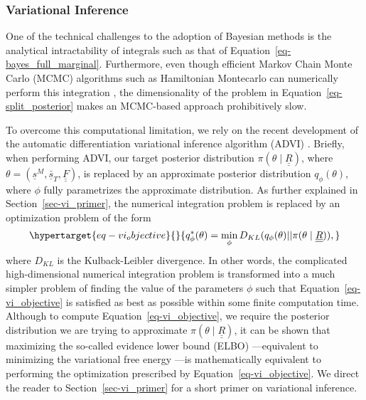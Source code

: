 \documentclass[
  letterpaper,
  DIV=11,
  numbers=noendperiod]{scrartcl}
\begin{document}
\begin{refsegment}
{\subsubsection{Variational Inference}\label{variational-inference}}

One of the technical challenges to the adoption of Bayesian methods is
the analytical intractability of integrals such as that of
Equation~\ref{eq-bayes_full_marginal}. Furthermore, even though
efficient Markov Chain Monte Carlo (MCMC) algorithms such as Hamiltonian
Montecarlo can numerically perform this integration
\autocite{betancourt2017}, the dimensionality of the problem in
Equation~\ref{eq-split_posterior} makes an MCMC-based approach
prohibitively slow.

To overcome this computational limitation, we rely on the recent
development of the automatic differentiation variational inference
algorithm (ADVI) \autocite{kucukelbir2016}. Briefly, when performing
ADVI, our target posterior distribution
\(\pi(\theta \mid \underline{\underline{R}})\), where
\(\theta = (\underline{s}^M, \underline{\bar{s}}_T, \underline{\underline{F}})\),
is replaced by an approximate posterior distribution \(q_\phi(\theta)\),
where \(\phi\) fully parametrizes the approximate distribution. As
further explained in Section~\ref{sec-vi_primer}, the numerical
integration problem is replaced by an optimization problem of the form
\begin{equation}\protect\hypertarget{eq-vi_objective}{}{
q^*_\phi(\theta) = \min _\phi
D_{KL}(
    q_\phi(\theta) \lvert \lvert
    \pi(\theta \mid \underline{\underline{R}})
),
}\label{eq-vi_objective}\end{equation} where \(D_{KL}\) is the
Kulback-Leibler divergence. In other words, the complicated
high-dimensional numerical integration problem is transformed into a
much simpler problem of finding the value of the parameters \(\phi\)
such that Equation~\ref{eq-vi_objective} is satisfied as best as
possible within some finite computation time. Although to compute
Equation~\ref{eq-vi_objective}, we require the posterior distribution we
are trying to approximate
\(\pi(\theta \mid \underline{\underline{R}})\), it can be shown that
maximizing the so-called evidence lower bound (ELBO)
\autocite{kingma2014}---equivalent to minimizing the variational free
energy \autocite{gottwald2020}---is mathematically equivalent to
performing the optimization prescribed by
Equation~\ref{eq-vi_objective}. We direct the reader to
Section~\ref{sec-vi_primer} for a short primer on variational inference.


\end{refsegment}
\end{document}
